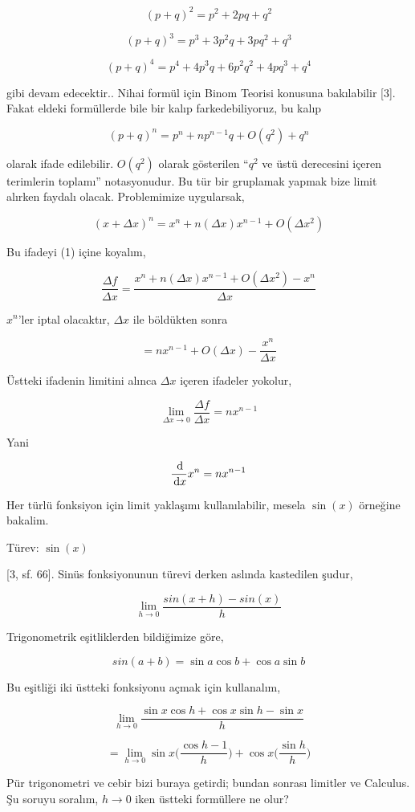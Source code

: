 \documentclass[12pt,fleqn]{article}\usepackage{../../common}
\begin{document}
$$
(p+q)^2 = p^2 + 2pq + q^2
$$

$$
(p+q)^3 = p^3 + 3 p^2 q + 3pq^2 + q^3
$$

$$
(p+q)^4 = p^4 + 4p^3 q + 6p^2 q^2 + 4p q^3 + q^4
$$

gibi devam edecektir.. Nihai formül için Binom Teorisi konusuna bakılabilir [3].
Fakat eldeki formüllerde bile bir kalıp farkedebiliyoruz, bu kalıp

$$
(p+q)^n = p^n + n p^{n-1} q + O(q^2) + q^n
$$

olarak ifade edilebilir. $O(q^2)$ olarak gösterilen ``$q^2$ ve üstü derecesini
içeren terimlerin toplamı'' notasyonudur. Bu tür bir gruplamak yapmak bize limit
alırken faydalı olacak. Problemimize uygularsak,

$$
(x+\Delta x)^n = x^n + n (\Delta x)x^{n-1} + O(\Delta x^2)
$$

Bu ifadeyi (1) içine koyalım,

$$
\frac{\Delta f}{\Delta x} =
\frac{x^n + n (\Delta x)x^{n-1} + O(\Delta x^2) - x^n}{\Delta x}
$$

$x^n$'ler iptal olacaktır, $\Delta x$ ile böldükten sonra

$$
= n x^{n-1} + O(\Delta x) - \frac{x^n}{\Delta x}
$$

Üstteki ifadenin limitini alınca $\Delta x$ içeren ifadeler yokolur,

$$
\lim_{\Delta x \to 0} \frac{\Delta f}{\Delta x} =
n x^{n-1}
$$

Yani

$$
\frac{\,\mathrm{d} }{\,\mathrm{d} x} x^n = n x^{n-1}
$$

Her türlü fonksiyon için limit yaklaşımı kullanılabilir, mesela $\sin(x)$
örneğine bakalim.

Türev: $\sin(x)$

[3, sf. 66]. Sinüs fonksiyonunun türevi derken aslında kastedilen şudur,

$$ \lim_{h \to 0} \frac{sin(x+h) - sin(x)}{h} $$

Trigonometrik eşitliklerden bildiğimize göre, 

$$ sin(a+b) = \sin a \cos b + \cos a \sin b $$

Bu eşitliği iki üstteki fonksiyonu açmak için kullanalım,

$$ \lim_{h \to 0} \frac{\sin x \cos h + \cos x \sin h - \sin x }{h} $$

$$ = \lim_{h \to 0} \sin x \bigg( \frac{\cos h - 1}{h} \bigg) + \cos x \bigg( \frac{\sin h}{h} \bigg) $$

Pür trigonometri ve cebir bizi buraya getirdi; bundan sonrası limitler ve
Calculus. Şu soruyu soralım, $h \to 0$ iken üstteki formüllere ne olur? 
\end{document}
